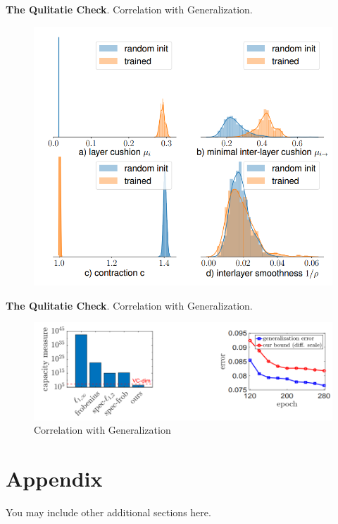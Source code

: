 \documentclass{article} %
\newcommand\fakeparagraph[1]{\par\noindent\textbf{{#1}}.\xspace}
\begin{document}
\fakeparagraph{The Qulitatie Check} Correlation with Generalization.
\begin{figure}[h]
\begin{center}
\includegraphics[width=0.6\columnwidth]{pix/QualitativeCheck.png}
\caption{}
\end{center}
\label{QualitativeCheck}
\end{figure}
\fakeparagraph{The Qulitatie Check} Correlation with Generalization.
\begin{figure}[h]
\begin{center}
\includegraphics[width=0.7\columnwidth]{pix/CorrelationtoGeneralization.png}
\caption{Correlation with Generalization}
\end{center}
\label{QualitativeCheck}
\end{figure}






















\appendix
\section{Appendix}
You may include other additional sections here. 
\end{document}
